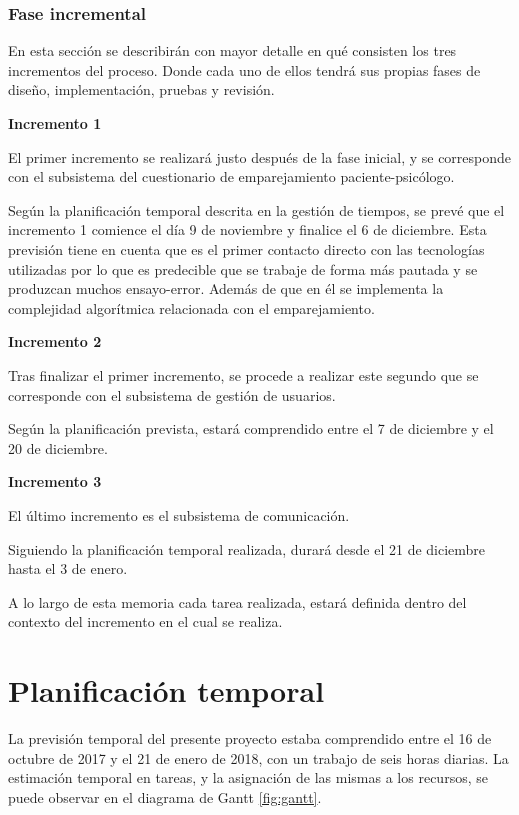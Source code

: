 \subsubsection{Fase incremental}
En esta sección se describirán con mayor detalle en qué consisten los tres incrementos del proceso. Donde cada uno de ellos tendrá sus propias fases de diseño, implementación, pruebas y revisión.

\textbf{Incremento 1}


El primer incremento se realizará justo después de la fase inicial, y se corresponde con el subsistema del cuestionario de emparejamiento paciente-psicólogo.


Según la planificación temporal descrita en la gestión de tiempos, se prevé que el incremento 1 comience el día 9 de noviembre y finalice el 6 de diciembre. Esta previsión tiene en cuenta que es el primer contacto directo con las tecnologías utilizadas por lo que es predecible que se trabaje de forma más pautada y se produzcan muchos ensayo-error. Además de que en él se implementa la complejidad algorítmica relacionada con el emparejamiento.


\textbf{Incremento 2}


Tras finalizar el primer incremento, se procede a realizar este segundo que se corresponde con el subsistema de gestión de usuarios.


Según la planificación prevista, estará comprendido entre el 7 de diciembre y el 20 de diciembre.


\textbf{Incremento 3}


El último incremento es el subsistema de comunicación. 


Siguiendo la planificación temporal realizada, durará desde el 21 de diciembre hasta el 3 de enero.


A lo largo de esta memoria cada tarea realizada, estará definida dentro del contexto del incremento en el cual se realiza.


\section{Planificación temporal}
La previsión temporal del presente proyecto estaba comprendido entre el 16 de octubre de 2017 y el 21 de enero de 2018, con un trabajo de seis horas diarias. La estimación temporal en tareas, y la asignación de las mismas a los recursos, se puede observar en el diagrama de Gantt \ref{fig:gantt}.

